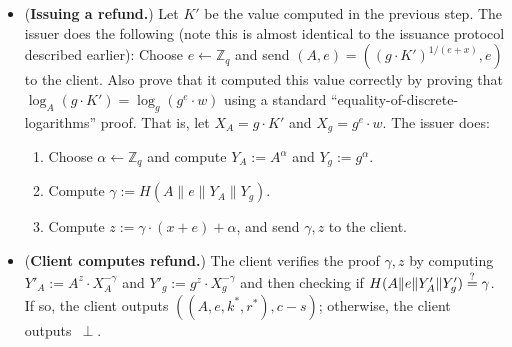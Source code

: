 \documentclass[11pt]{article}
\def\Z{{\mathbb Z}}
\def\Z{{\mathbb Z}}
\def\isequal{\stackrel{\rm ?}{=}}
\begin{document}
\begin{itemize}
\item ({\bf Issuing a refund.}) Let $K'$ be the value computed in the previous step. The issuer does the following (note this is almost identical to the issuance protocol described earlier):
Choose
$e \leftarrow \Z_q$ and send
$(A, e) = \left(\left(g \cdot K'\right)^{1/(e+x)}, e\right)$
to the client. 
Also prove that it computed this value correctly by proving that $\log_A \left(g \cdot K'\right) = \log_g \left(g^e \cdot w\right)$ using a standard ``equality-of-discrete-logarithms'' proof. 
That is, let $X_A = g \cdot K'$ and $X_g = g^e \cdot w$. The issuer does:
\begin{enumerate}
    \item Choose $\alpha \leftarrow \Z_q$ and compute $Y_A:= A^{\alpha}$ and $Y_g:=g^\alpha$.
    \item Compute $\gamma:=H(A\|e\|Y_A\|Y_g)$.
    \item Compute $z:=\gamma\cdot (x+e)+\alpha$, and send $\gamma, z$ to the client.
\end{enumerate}

\item ({\bf Client computes refund.}) The client verifies the proof $\gamma, z$ by computing $Y'_A:= A^z \cdot X_A^{-\gamma}$ and $Y'_g:=g^z \cdot X_g^{-\gamma}$ and then
checking if 
$H( A\|e\|Y'_A \| Y'_g ) \isequal \gamma$. If so, the client outputs $((A, e, k^*, r^*), c-s)$; otherwise, the client outputs~$\perp$.
\end{itemize}
\end{document}
